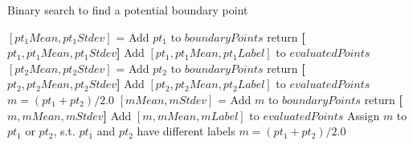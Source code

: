 \begin{algorithm}[H] {
\caption{Binary search to find a potential boundary point}
\label{alg:boundaryPt}
\begin{algorithmic}[1]
    \State $[pt_1Mean, pt_1Stdev]$ = 
            \State Add $pt_1$ to $boundaryPoints$
            \State return \textbf{[$pt_1, pt_1Mean, pt_1Stdev$]}
        \Else 
            \State Add $[pt_1,pt_1Mean,pt_1Label]$ to $evaluatedPoints$
    \EndIf
    \State $[pt_2Mean, pt_2Stdev]$ = 
            \State Add $pt_2$ to $boundaryPoints$
            \State return \textbf{[$pt_2, pt_2Mean, pt_2Stdev$]}
        \Else 
            \State Add $[pt_2,pt_2Mean,pt_2Label]$ to $evaluatedPoints$
    \EndIf
    \State $m = (pt_1 + pt_2)/2.0$ 
        \State $[mMean, mStdev]$ = 
            \State Add $m$ to $boundaryPoints$
            \State return \textbf{[$m, mMean, mStdev$]}
        \Else 
            \State Add $[m,mMean,mLabel]$ to $evaluatedPoints$ 
        \EndIf
        \State Assign $m$ to $pt_1$ or $pt_2$, s.t. $pt_1$ and $pt_2$ have different labels
        \State $m = (pt_1 + pt_2)/2.0$ 
    \EndWhile
\EndProcedure
\end{algorithmic}
}
\end{algorithm}